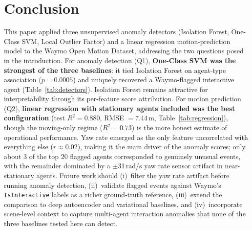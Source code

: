 \documentclass[conference]{IEEEtran}
\begin{document}
\section{Conclusion}

This paper applied three unsupervised anomaly detectors (Isolation Forest, One-Class SVM, Local Outlier Factor) and a linear regression motion-prediction model to the Waymo Open Motion Dataset, addressing the two questions posed in the introduction. For anomaly detection (Q1), \textbf{One-Class SVM was the strongest of the three baselines}: it tied Isolation Forest on agent-type association ($p = 0.0005$) and uniquely recovered a Waymo-flagged interactive agent (Table~\ref{tab:detectors}). Isolation Forest remains attractive for interpretability through its per-feature score attribution. For motion prediction (Q2), \textbf{linear regression with stationary agents included was the best configuration} (test $R^2 = 0.880$, RMSE $= 7.44$\,m, Table~\ref{tab:regression}), though the moving-only regime ($R^2 = 0.73$) is the more honest estimate of operational performance. Yaw rate emerged as the only feature uncorrelated with everything else ($r \approx 0.02$), making it the main driver of the anomaly scores; only about 3 of the top 20 flagged agents corresponded to genuinely unusual events, with the remainder dominated by a $\pm$31\,rad/s yaw rate sensor artifact in near-stationary agents. Future work should (i)~filter the yaw rate artifact before running anomaly detection, (ii)~validate flagged events against Waymo's \texttt{IsInteractive} labels as a richer ground-truth reference, (iii)~extend the comparison to deep autoencoder and variational baselines, and (iv)~incorporate scene-level context to capture multi-agent interaction anomalies that none of the three baselines tested here can detect.



\end{document}
